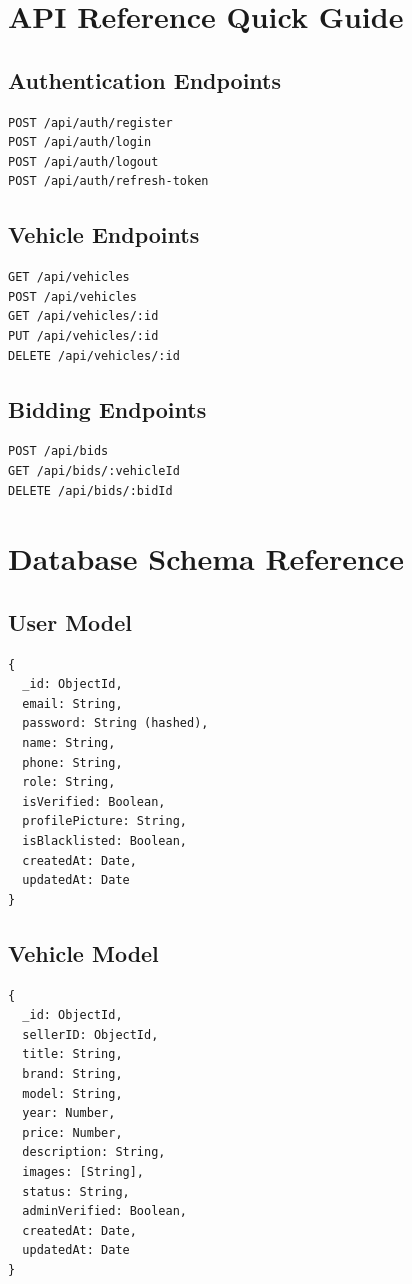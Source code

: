 \section{API Reference Quick Guide}

\subsection{Authentication Endpoints}
\begin{verbatim}
POST /api/auth/register
POST /api/auth/login
POST /api/auth/logout
POST /api/auth/refresh-token
\end{verbatim}

\subsection{Vehicle Endpoints}
\begin{verbatim}
GET /api/vehicles
POST /api/vehicles
GET /api/vehicles/:id
PUT /api/vehicles/:id
DELETE /api/vehicles/:id
\end{verbatim}

\subsection{Bidding Endpoints}
\begin{verbatim}
POST /api/bids
GET /api/bids/:vehicleId
DELETE /api/bids/:bidId
\end{verbatim}

\section{Database Schema Reference}

\subsection{User Model}
\begin{verbatim}
{
  _id: ObjectId,
  email: String,
  password: String (hashed),
  name: String,
  phone: String,
  role: String,
  isVerified: Boolean,
  profilePicture: String,
  isBlacklisted: Boolean,
  createdAt: Date,
  updatedAt: Date
}
\end{verbatim}

\subsection{Vehicle Model}
\begin{verbatim}
{
  _id: ObjectId,
  sellerID: ObjectId,
  title: String,
  brand: String,
  model: String,
  year: Number,
  price: Number,
  description: String,
  images: [String],
  status: String,
  adminVerified: Boolean,
  createdAt: Date,
  updatedAt: Date
}
\end{verbatim}

